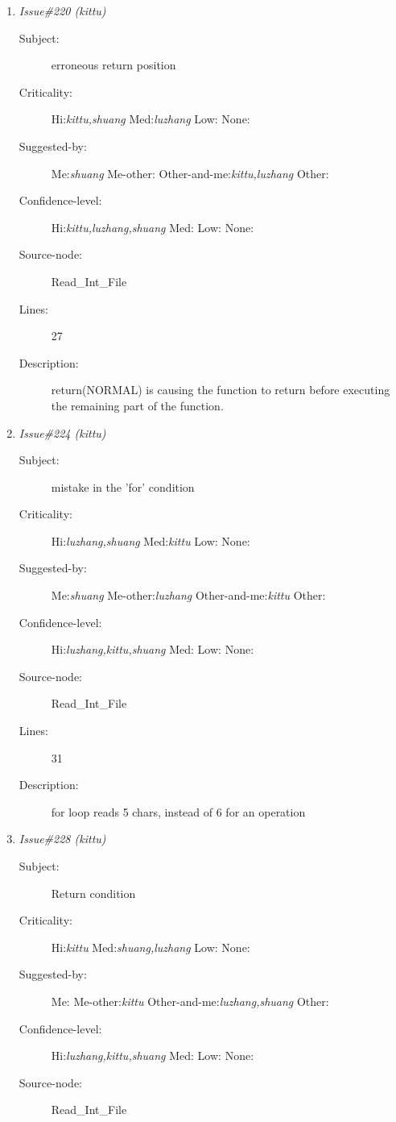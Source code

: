 \begin{enumerate}
\begin{description}
\item [Lines:] 18

\item [Description:] If condition doesn't satisfy the condition,
when the source line is a comment
\end{description}
\item {\it Issue\#220 (kittu)}
\begin{description}
\item [Subject:] erroneous return position
\item [Criticality:] Hi:{\it kittu,shuang} Med:{\it luzhang} Low:{\it } None:{\it }
\item [Suggested-by:] Me:{\it shuang} Me-other:{\it } Other-and-me:{\it kittu,luzhang} Other:{\it }
\item [Confidence-level:] Hi:{\it kittu,luzhang,shuang} Med:{\it } Low:{\it } None:{\it }
\item [Source-node:] Read\_Int\_File

\item [Lines:] 27

\item [Description:] return(NORMAL) is causing the function to
return before executing the remaining part of the function.
\end{description}
\item {\it Issue\#224 (kittu)}
\begin{description}
\item [Subject:] mistake in the 'for' condition
\item [Criticality:] Hi:{\it luzhang,shuang} Med:{\it kittu} Low:{\it } None:{\it }
\item [Suggested-by:] Me:{\it shuang} Me-other:{\it luzhang} Other-and-me:{\it kittu} Other:{\it }
\item [Confidence-level:] Hi:{\it luzhang,kittu,shuang} Med:{\it } Low:{\it } None:{\it }
\item [Source-node:] Read\_Int\_File

\item [Lines:] 31

\item [Description:] for loop reads 5 chars, instead of 6 for an operation
\end{description}
\item {\it Issue\#228 (kittu)}
\begin{description}
\item [Subject:] Return condition
\item [Criticality:] Hi:{\it kittu} Med:{\it shuang,luzhang} Low:{\it } None:{\it }
\item [Suggested-by:] Me:{\it } Me-other:{\it kittu} Other-and-me:{\it luzhang,shuang} Other:{\it }
\item [Confidence-level:] Hi:{\it luzhang,kittu,shuang} Med:{\it } Low:{\it } None:{\it }
\item [Source-node:] Read\_Int\_File


\end{description}
\end{enumerate}
